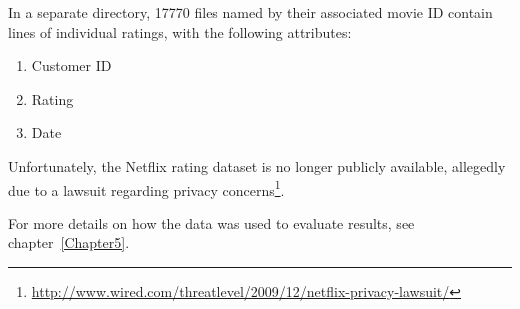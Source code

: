 In a separate directory, 17770 files named by their associated movie ID contain lines of individual ratings, with the following attributes:

\begin{enumerate}
  \item Customer ID
  \item Rating
  \item Date
\end{enumerate}

Unfortunately, the Netflix rating dataset is no longer publicly available, allegedly due to a lawsuit regarding privacy concerns\footnote{\url{http://www.wired.com/threatlevel/2009/12/netflix-privacy-lawsuit/}}.

For more details on how the data was used to evaluate results, see chapter~\ref{Chapter5}.
